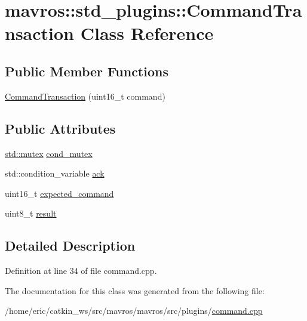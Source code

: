 \hypertarget{classmavros_1_1std__plugins_1_1CommandTransaction}{}\section{mavros\+::std\+\_\+plugins\+::Command\+Transaction Class Reference}
\label{classmavros_1_1std__plugins_1_1CommandTransaction}
\subsection*{Public Member Functions}
\begin{DoxyCompactItemize}
\item 
\mbox{\hyperlink{group__plugin_ga658577aae97bc7739a5bfbd71e16af2e}{Command\+Transaction}} (uint16\+\_\+t command)
\end{DoxyCompactItemize}
\subsection*{Public Attributes}
\begin{DoxyCompactItemize}
\item 
\mbox{\hyperlink{data_8c_a4acff8232e4aec9cd5c6dc200ac55ef3}{std\+::mutex}} \mbox{\hyperlink{group__plugin_gaf3f74e20bdc98d39e8aedab007212e66}{cond\+\_\+mutex}}
\item 
std\+::condition\+\_\+variable \mbox{\hyperlink{group__plugin_gadb97fd9fc709112a544a52a24ecde527}{ack}}
\item 
uint16\+\_\+t \mbox{\hyperlink{group__plugin_gac9fd4b59474130b5bbc429fbbb5b6298}{expected\+\_\+command}}
\item 
uint8\+\_\+t \mbox{\hyperlink{group__plugin_ga2a8b012d390601f0b01d311c3c733d7a}{result}}
\end{DoxyCompactItemize}


\subsection{Detailed Description}


Definition at line 34 of file command.\+cpp.



The documentation for this class was generated from the following file\+:\begin{DoxyCompactItemize}
\item 
/home/eric/catkin\+\_\+ws/src/mavros/mavros/src/plugins/\mbox{\hyperlink{command_8cpp}{command.\+cpp}}\end{DoxyCompactItemize}
